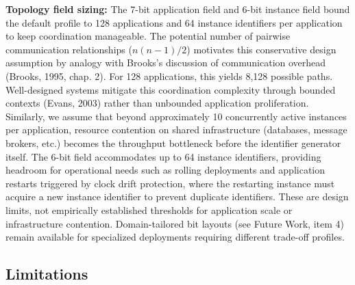 \documentclass[fleqn,10pt]{wlpeerj}
\begin{document}
\textbf{Topology field sizing:} The 7-bit application field and 6-bit
instance field bound the default profile to 128 applications and 64
instance identifiers per application to keep coordination manageable.
The potential number of pairwise communication relationships
(\(n(n-1)/2\)) motivates this conservative design assumption by analogy
with Brooks's discussion of communication overhead (Brooks, 1995, chap.
2). For 128 applications, this yields 8,128 possible paths.
Well-designed systems mitigate this coordination complexity through
bounded contexts (Evans, 2003) rather than unbounded application
proliferation. Similarly, we assume that beyond approximately 10
concurrently active instances per application, resource contention on
shared infrastructure (databases, message brokers, etc.) becomes the
throughput bottleneck before the identifier generator itself. The 6-bit
field accommodates up to 64 instance identifiers, providing headroom for
operational needs such as rolling deployments and application restarts
triggered by clock drift protection, where the restarting instance must
acquire a new instance identifier to prevent duplicate identifiers.
These are design limits, not empirically established thresholds for
application scale or infrastructure contention. Domain-tailored bit
layouts (see Future Work, item 4) remain available for specialized
deployments requiring different trade-off profiles.

\subsection{Limitations}\label{limitations}
\end{document}
